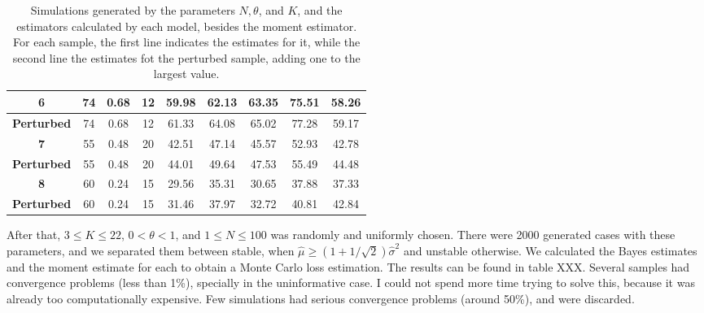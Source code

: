 \begin{table}[!ht]
\begin{tabular}{|c|c|c|c|c|c|c|c|c|}
        6                  & 74           & 0.68        & 12          & 59.98         & 62.13          & 63.35            & 75.51              & 58.26           \\ \hline
        \textbf{Perturbed} & 74           & 0.68        & 12          & 61.33         & 64.08          & 65.02            & 77.28              & 59.17           \\ \hline
        \textbf{7}         & 55           & 0.48        & 20          & 42.51         & 47.14          & 45.57            & 52.93              & 42.78           \\ \hline
        \textbf{Perturbed} & 55           & 0.48        & 20          & 44.01         & 49.64          & 47.53            & 55.49              & 44.48           \\ \hline
        \textbf{8}         & 60           & 0.24        & 15          & 29.56         & 35.31          & 30.65            & 37.88              & 37.33           \\ \hline
        \textbf{Perturbed} & 60           & 0.24        & 15          & 31.46         & 37.97          & 32.72            & 40.81              & 42.84           \\ \hline
        \end{tabular}
    \caption{Simulations generated by the parameters $N, \theta$, and $K$, and the estimators calculated by each model, besides the moment estimator. For each sample, the first line indicates the estimates for it, while the second line the estimates fot the perturbed sample, adding one to the largest value.}
    \label{tab:simulations-estimates}
\end{table}
    
    \ind After that, $3 \le K \le 22$, $0 < \theta < 1$, and $1 \le N \le 100$ was
    randomly and uniformly chosen. There were 2000 generated cases with these
    parameters, and we separated them between stable, when $\hat{\mu} \ge (1 +
    1/\sqrt{2})\hat{\sigma}^2$ and unstable otherwise. We calculated the Bayes
    estimates and the moment estimate for each to obtain a Monte Carlo loss
    estimation. The results can be found in table XXX. Several samples had
    convergence problems (less than 1\%), specially in the uninformative case.
    I could not spend more time trying to solve this, because it was already
    too computationally expensive. Few simulations had serious convergence 
    problems (around 50\%), and were discarded. 